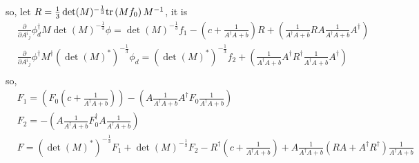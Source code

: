 so, let $R=\frac{1}{3}\det(M)^{-\frac{1}{3}} {\rm tr}\left(Mf_0\right) M^{-1}$, it is
\begin{equation}
\begin{split}
&\frac{\partial}{\partial A{}^i{}_j}\phi _d^{\dagger} M \det(M)^{-\frac{1}{3}}\phi=\det(M)^{-\frac{1}{3}}f_1 - \left(c+\frac{1}{A^{\dagger}A+b}\right) R +\left(\frac{1}{A^{\dagger}A+b}RA\frac{1}{A^{\dagger}A+b}A^{\dagger}\right)\\
&\frac{\partial}{\partial A{}^i{}_j}\phi ^{\dagger} M^{\dagger} (\det(M)^*)^{-\frac{1}{3}}\phi _d=(\det(M)^*)^{-\frac{1}{3}} f_2 + \left(\frac{1}{A^{\dagger}A+b}A^{\dagger}R^{\dagger}\frac{1}{A^{\dagger}A+b}A^{\dagger}\right) \\
\end{split}
\end{equation}
so,
\begin{equation}
\begin{split}
&F_1=\left(F_0\left(c+\frac{1}{A^{\dagger}A+b}\right)\right)-\left(A \frac{1}{A^{\dagger}A+b} A^{\dagger}F_0 \frac{1}{A^{\dagger}A+b}\right)\\
&F_2=-\left(A \frac{1}{A^{\dagger}A+b} F_0^{\dagger} A \frac{1}{A^{\dagger}A+b}\right)\\
&F=(\det(M)^*)^{-\frac{1}{3}}F_1+\det(M)^{-\frac{1}{3}}F_2-R^{\dagger}\left(c+\frac{1}{A^{\dagger}A+b}\right) + A\frac{1}{A^{\dagger}A+b} (RA+A^{\dagger}R^{\dagger})\frac{1}{A^{\dagger}A+b}
\end{split}
\end{equation}

